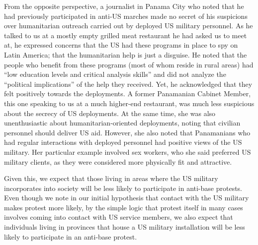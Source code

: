		From the opposite perspective, a journalist in Panama City who noted that he had previously participated in anti-US marches made no secret of his suspicions over humanitarian outreach carried out by deployed US military personnel. As he talked to us at a mostly empty grilled meat restaurant he had asked us to meet at, he expressed concerns that the US had these programs in place to spy on Latin America; that the humanitarian help is just a disguise. He noted that the people who benefit from these programs (most of whom reside in rural areas) had ``low education levels and critical analysis skills'' and did not analyze the ``political implications'' of the help they received. Yet, he acknowledged that they felt positively towards the deployments.\cite{journ20180713} A former Panamanian Cabinet Member, this one speaking to us at a much higher-end restaurant, was much less suspicious about the secrecy of US deployments. At the same time, she was also unenthusiastic about humanitarian-oriented deployments, noting that civilian personnel should deliver US aid. However, she also noted that Panamanians who had regular interactions with deployed personnel had positive views of the US military. Her particular example involved sex workers, who she said preferred US military clients, as they were considered more physically fit and attractive.\cite{journ20180712} 
		
		Given this, we expect that those living in areas where the US military incorporates into society will be less likely to participate in anti-base protests. Even though we note in our initial hypothesis that contact with the US military makes protest more likely, by the simple logic that protest itself in many cases involves coming into contact with US service members, we also expect that individuals living in provinces that house a US military installation will be less likely to participate in an anti-base protest. 
		
		
		
